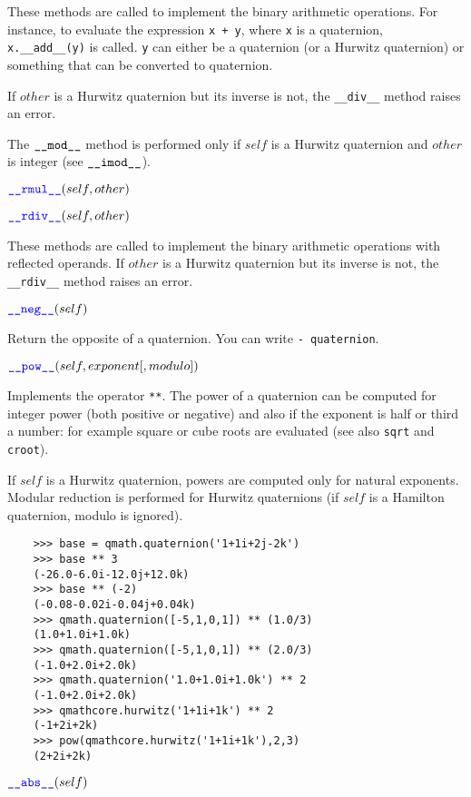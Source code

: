 \documentclass[11pt]{paper}
\begin{document}
These methods are called to implement the binary arithmetic operations. For instance, to evaluate the expression \texttt{x + y}, where \texttt{x} is a quaternion, \texttt{x.\_\_\mbox{add}\_\_(y)} is called. \texttt{y} can either be a quaternion (or a Hurwitz quaternion) or something that can be converted to quaternion. 

\noindent If $other$ is a Hurwitz quaternion but its inverse is not, the \texttt{\_\_\mbox{div}\_\_} method raises an error.

\noindent The $\texttt{\_\_\mbox{mod}\_\_}$ method is performed only if $self$ is a Hurwitz quaternion and $other$ is integer (see $\texttt{\_\_\mbox{imod}\_\_}$).


\medskip

\noindent $\textcolor{blue}{\texttt{\_\_\mbox{rmul}\_\_}}(self,other)$ 

\noindent $\textcolor{blue}{\texttt{\_\_\mbox{rdiv}\_\_}}(self,other)$

These methods are called to implement the binary arithmetic operations with reflected operands. If $other$ is a Hurwitz quaternion but its inverse is not, the \texttt{\_\_\mbox{rdiv}\_\_} method raises an error.



\medskip        
\noindent $\textcolor{blue}{\texttt{\_\_\mbox{neg}\_\_}}(self)$

Return the opposite of a quaternion. You can write \texttt{- quaternion}.


\medskip
\noindent $\textcolor{blue}{\texttt{\_\_\mbox{pow}\_\_}}(self,exponent[,modulo])$

Implements the operator \texttt{**}. The power of a quaternion can be computed for integer power (both positive or negative) and also if the exponent is half or third a number: for example square or cube roots are evaluated (see also \texttt{sqrt} and \texttt{croot}).

\noindent If $self$ is a Hurwitz quaternion, powers are computed only for natural exponents.
Modular reduction is performed for Hurwitz quaternions (if $self$ is a Hamilton quaternion, modulo is ignored).
\begin{verbatim}
    >>> base = qmath.quaternion('1+1i+2j-2k')
    >>> base ** 3
    (-26.0-6.0i-12.0j+12.0k)
    >>> base ** (-2)
    (-0.08-0.02i-0.04j+0.04k)
    >>> qmath.quaternion([-5,1,0,1]) ** (1.0/3)
    (1.0+1.0i+1.0k)
    >>> qmath.quaternion([-5,1,0,1]) ** (2.0/3)
    (-1.0+2.0i+2.0k)
    >>> qmath.quaternion('1.0+1.0i+1.0k') ** 2
    (-1.0+2.0i+2.0k)
    >>> qmathcore.hurwitz('1+1i+1k') ** 2
    (-1+2i+2k)
    >>> pow(qmathcore.hurwitz('1+1i+1k'),2,3)
    (2+2i+2k)
\end{verbatim}
\medskip
\noindent $\textcolor{blue}{\texttt{\_\_\mbox{abs}\_\_}}(self)$ 
\end{document}
